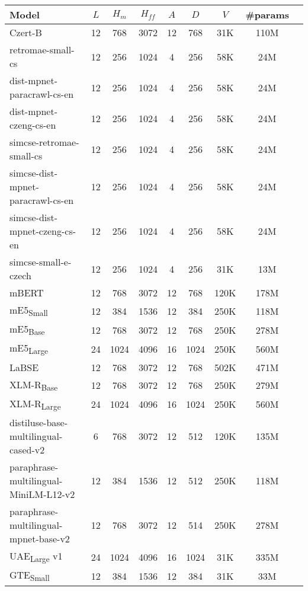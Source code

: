 \begin{table*}[t!]
    \centering
    \begin{tabular}{lcccccccc}
      \toprule
      \textbf{Model} & $L$ & $H_m$ & $H_{ff}$ & $A$ & $D$ & $V$ & \textbf{\#params} \\
      \midrule
      Czert-B & 12 & 768 & 3072 & 12 & 768 & 31K & 110M \\
      retromae-small-cs & 12 & 256 & 1024 & 4 & 256 & 58K & 24M \\
      dist-mpnet-paracrawl-cs-en & 12 & 256 & 1024 & 4 & 256 & 58K & 24M \\
      dist-mpnet-czeng-cs-en & 12 & 256 & 1024 & 4 & 256 & 58K & 24M \\
      simcse-retromae-small-cs & 12 & 256 & 1024 & 4 & 256 & 58K & 24M \\
      simcse-dist-mpnet-paracrawl-cs-en & 12 & 256 & 1024 & 4 & 256 & 58K & 24M \\
      simcse-dist-mpnet-czeng-cs-en & 12 & 256 & 1024 & 4 & 256 & 58K & 24M \\
      simcse-small-e-czech & 12 & 256 & 1024 & 4 & 256 & 31K & 13M \\
      mBERT & 12 & 768 & 3072 & 12 & 768 & 120K & 178M \\
      mE5\textsubscript{Small} & 12 & 384 & 1536 & 12 & 384 & 250K & 118M \\
      mE5\textsubscript{Base} & 12 & 768 & 3072 & 12 & 768 & 250K & 278M \\
      mE5\textsubscript{Large} & 24 & 1024 & 4096 & 16 & 1024 & 250K & 560M \\
      LaBSE & 12 & 768 & 3072 & 12 & 768 & 502K & 471M \\
      XLM-R\textsubscript{Base} & 12 & 768 & 3072 & 12 & 768 & 250K & 279M \\
      XLM-R\textsubscript{Large} & 24 & 1024 & 4096 & 16 & 1024 & 250K & 560M \\
      distiluse-base-multilingual-cased-v2 & 6 & 768 & 3072 & 12 & 512 & 120K & 135M \\
      paraphrase-multilingual-MiniLM-L12-v2 & 12 & 384 & 1536 & 12 & 512 & 250K & 118M \\
      paraphrase-multilingual-mpnet-base-v2 & 12 & 768 & 3072 & 12 & 514 & 250K & 278M \\
      UAE\textsubscript{Large} v1 & 24 & 1024 & 4096 & 16 & 1024 & 31K & 335M \\
      GTE\textsubscript{Small} & 12 & 384 & 1536 & 12 & 384 & 31K & 33M \\

\end{tabular}
\end{table*}
